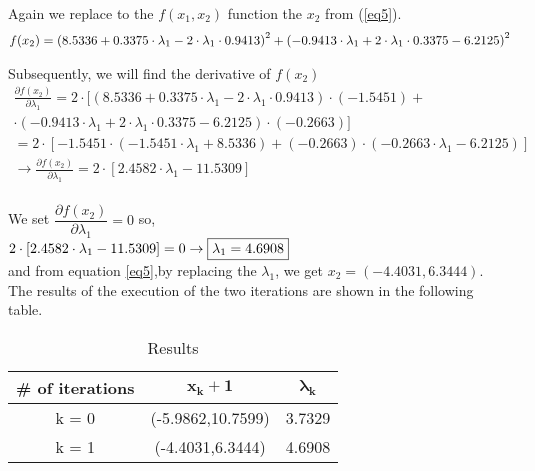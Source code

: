 Again we replace to the $f(x_1,x_2)$ function the $x_2$ from (\ref{eq5}).
\begin{equation}
	\centering
	\begin{gathered}
		f(x_2) = \left(8.5336+0.3375 \cdot \lambda_1-2 \cdot \lambda_1 \cdot 0.9413 \right)^2+\left(-0.9413 \cdot \lambda_1+2 \cdot \lambda_1 \cdot 0.3375-6.2125\right)^2
	\end{gathered}
\end{equation}
\label{eq6}

Subsequently, we will find the derivative of $f(x_2)$\\
\[
\begin{gathered}
	\frac{\partial f(x_2)}{\partial \lambda_1} = 2\cdot[(8.5336+0.3375 \cdot \lambda_1-2 \cdot \lambda_1 \cdot 0.9413) \cdot (-1.5451)
	+ \\ \cdot(-0.9413 \cdot \lambda_1+2 \cdot \lambda_1 \cdot 0.3375-6.2125) \cdot (-0.2663)]\\
	= 2 \cdot [-1.5451 \cdot (-1.5451 \cdot \lambda_1+8.5336)+(-0.2663)\cdot(-0.2663\cdot\lambda_1-6.2125)] \\[2mm]
	\rightarrow \frac{\partial f(x_2)}{\partial \lambda_1} = 2\cdot[2.4582 \cdot \lambda_1-11.5309]
\end{gathered}
\]\\

We set $\dfrac{\partial f(x_2)}{\partial \lambda_1} = 0$ so,\\

$2\cdot[2.4582 \cdot \lambda_1-11.5309] = 0 \rightarrow \fbox{{\(\lambda_1 = 4.6908\)}}$ \\

and from equation \ref{eq5},by replacing the $\lambda_1$, we get $x_2 = (-4.4031,6.3444)$.
\\[4mm]
The results of the execution of the two iterations are shown in the following table.

\begin{table}[H]
	\centering
	\begin{tabular}{|c|c|c|}
		\hline
		\textbf{\# of iterations} & $\mathbf{x_k+1}$ & $\mathbf{\lambda_k}$ \\ \hline
		k = 0 & (-5.9862,10.7599) & 3.7329 \\ \hline
		k = 1 & (-4.4031,6.3444) & 4.6908\\
		\hline
	\end{tabular}
	\caption{Results}
\end{table}











